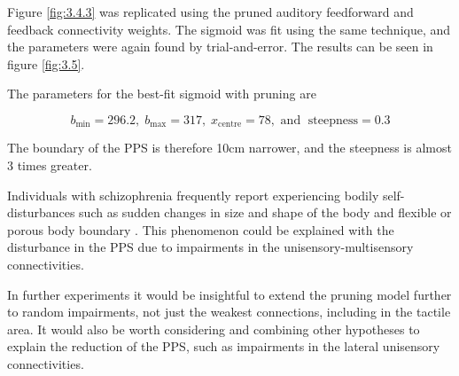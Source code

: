 \documentclass[12pt]{article}
\begin{document}
Figure \ref{fig:3.4.3} was replicated using the pruned auditory feedforward and feedback connectivity weights. The sigmoid was fit using the same technique, and the parameters were again found by trial-and-error. The results can be seen in figure \ref{fig:3.5}. 

The parameters for the best-fit sigmoid with pruning are

\[b_{\mathrm{min}} = 296.2, \;
  b_{\mathrm{max}} = 317, \;
  x_{\mathrm{centre}}= 78, \text{ and } \;
  \mathrm{steepness} =  0.3\]

The boundary of the PPS is therefore 10cm narrower, and the steepness is almost 3 times greater. 

Individuals with schizophrenia frequently report experiencing bodily self-disturbances such as sudden changes in size and shape of the body and flexible or porous body boundary \cite{VR}. This phenomenon could be explained with the disturbance in the PPS due to impairments in the unisensory-multisensory connectivities. 

In further experiments it would be insightful to extend the pruning model further to random impairments, not just the weakest connections, including in the tactile area. It would also be worth considering and combining other hypotheses to explain the reduction of the PPS, such as impairments in the lateral unisensory connectivities. 


\end{document}
